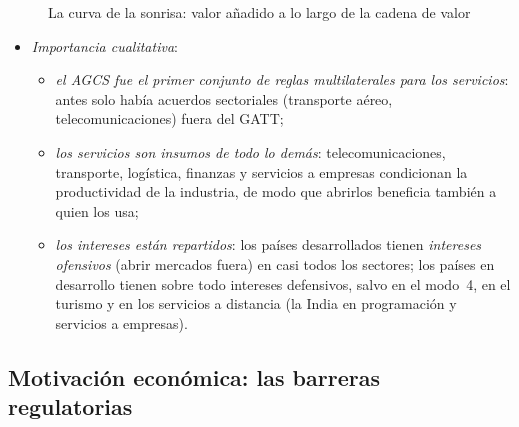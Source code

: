 \documentclass[11pt]{article}
\begin{document}
\begin{figure}[H]
\centering
\caption{La curva de la sonrisa: valor añadido a lo largo de la cadena de valor}\label{fig:sonrisa}
\end{figure}

\begin{itemize}
\item \emph{Importancia cualitativa}:
  \begin{itemize}
  \item \emph{el AGCS fue el primer conjunto de reglas multilaterales para los servicios}: antes solo había acuerdos sectoriales (transporte aéreo, telecomunicaciones) fuera del GATT;
  \item \emph{los servicios son insumos de todo lo demás}: telecomunicaciones, transporte, logística, finanzas y servicios a empresas condicionan la productividad de la industria, de modo que abrirlos beneficia también a quien los usa;
  \item \emph{los intereses están repartidos}: los países desarrollados tienen \emph{intereses ofensivos} (abrir mercados fuera) en casi todos los sectores; los países en desarrollo tienen sobre todo intereses defensivos, salvo en el modo~4, en el turismo y en los servicios a distancia (la India en programación y servicios a empresas).
  \end{itemize}
\end{itemize}

\subsection{Motivación económica:\cortetitulo{} las barreras regulatorias}\label{sec:servicios-teoria}
\end{document}
